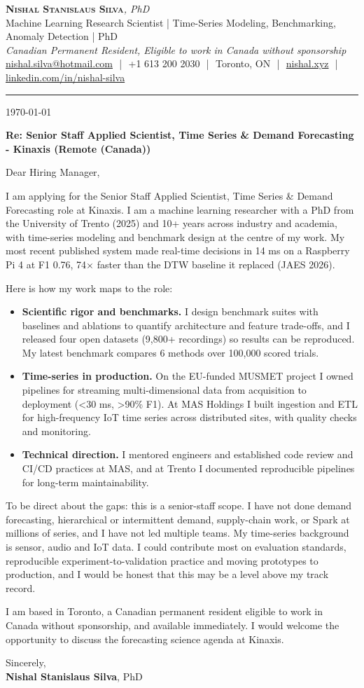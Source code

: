 \documentclass[11pt]{article}
\makeatletter
\newcommand{\clName}{Nishal Stanislaus Silva}
\newcommand{\clEmail}{nishal.silva@hotmail.com}
\newcommand{\clPhone}{+1 613 200 2030}
\newcommand{\clCity}{Toronto, ON}
\newcommand{\clSite}{https://nishal.xyz}
\newcommand{\clLinkedIn}{https://www.linkedin.com/in/nishal-silva}
\newcommand{\clStatus}{Canadian Permanent Resident, Eligible to work in Canada without sponsorship}
\newcommand{\clTagline}{Machine Learning Research Scientist | Time-Series Modeling, Benchmarking, Anomaly Detection | PhD}
\newcommand{\clRole}{Senior Staff Applied Scientist, Time Series \& Demand Forecasting}
\newcommand{\clCompany}{Kinaxis}
\newcommand{\clAddressee}{Dear Hiring Manager,}
\makeatother
\begin{document}
\pagestyle{empty}

\begin{center}
    {\LARGE \scshape \textbf{\clName}}{\large \textit{, PhD}}
    \\[1pt]
    {\small \clTagline}
    \\[1pt]
    {\footnotesize\textit{\clStatus}}
    \\[1pt]
    {\small
    \href{mailto:\clEmail}{\clEmail}
    \,\,|\,\, \clPhone
    \,\,|\,\, \clCity
    \,\,|\,\, \href{\clSite}{nishal.xyz}
    \,\,|\,\, \href{\clLinkedIn}{linkedin.com/in/nishal-silva}}
\end{center}

\rule{\linewidth}{0.4pt}\vspace{0.6em}

\today

\textbf{Re: \clRole{} - \clCompany{} (Remote (Canada))}

\clAddressee

I am applying for the \clRole{} role at \clCompany{}. I am a machine learning researcher with a PhD from the University of Trento (2025) and 10+ years across industry and academia, with time-series modeling and benchmark design at the centre of my work. My most recent published system made real-time decisions in 14 ms on a Raspberry Pi 4 at F1 0.76, 74$\times$ faster than the DTW baseline it replaced (JAES 2026).

Here is how my work maps to the role:
\begin{itemize}[leftmargin=1.4em, itemsep=0.1em, topsep=0.2em]
    \item \textbf{Scientific rigor and benchmarks.} I design benchmark suites with baselines and ablations to quantify architecture and feature trade-offs, and I released four open datasets (9,800+ recordings) so results can be reproduced. My latest benchmark compares 6 methods over 100,000 scored trials.
    \item \textbf{Time-series in production.} On the EU-funded MUSMET project I owned pipelines for streaming multi-dimensional data from acquisition to deployment (<30 ms, >90\% F1). At MAS Holdings I built ingestion and ETL for high-frequency IoT time series across distributed sites, with quality checks and monitoring.
    \item \textbf{Technical direction.} I mentored engineers and established code review and CI/CD practices at MAS, and at Trento I documented reproducible pipelines for long-term maintainability.
\end{itemize}
To be direct about the gaps: this is a senior-staff scope. I have not done demand forecasting, hierarchical or intermittent demand, supply-chain work, or Spark at millions of series, and I have not led multiple teams. My time-series background is sensor, audio and IoT data. I could contribute most on evaluation standards, reproducible experiment-to-validation practice and moving prototypes to production, and I would be honest that this may be a level above my track record.

I am based in Toronto, a Canadian permanent resident eligible to work in Canada without sponsorship, and available immediately. I would welcome the opportunity to discuss the forecasting science agenda at \clCompany{}.

\vspace{8pt}
Sincerely,\\[2pt]
\textbf{\clName}, PhD
\end{document}

